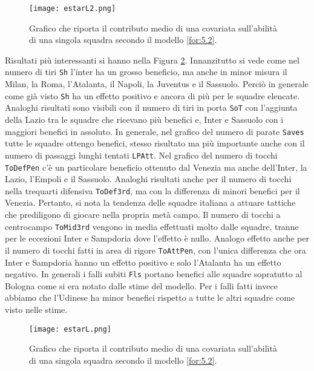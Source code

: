 \begin{figure}[htbp]
	\begin{center}
		\texttt{[image: estarL2.png]}
		\caption{Grafico che riporta il contributo medio di una covariata sull'abilità di una singola squadra secondo il modello \ref{for:5.2}.} \label{fig:effstar2}
	\end{center}
\end{figure}

Risultati più interessanti si hanno nella Figura \ref{fig:effstar3}. Innanzitutto si vede come nel numero di tiri \texttt{Sh} l'inter ha un grosso beneficio, ma anche in minor misura il Milan, la Roma, l'Atalanta, il Napoli, la Juventus e il Sassuolo. Perciò in generale come già visto \texttt{Sh} ha un effetto positivo e ancora di più per le squadre elencate. Analoghi risultati sono visibili con il numero di tiri in porta \texttt{SoT} con l'aggiunta della Lazio tra le squadre che ricevano più benefici e, Inter e Sassuolo con i maggiori benefici in assoluto. In generale, nel grafico del numero di parate \texttt{Saves} tutte le squadre ottengo benefici, stesso risultato ma più importante anche con il numero di passaggi lunghi tentati \texttt{LPAtt}. Nel grafico del numero di tocchi \texttt{ToDefPen} c'è un particolare beneficio ottenuto dal Venezia ma anche dell'Inter, la Lazio, l'Empoli e il Sassuolo. Analoghi risultati anche per il numero di tocchi nella trequarti difensiva \texttt{ToDef3rd}, ma con la differenza di minori benefici per il Venezia. Pertanto, si nota la tendenza delle squadre italiana a attuare tattiche che prediligono di giocare nella propria metà campo. Il numero di tocchi a centrocampo \texttt{ToMid3rd} vengono in media effettuati molto dalle squadre, tranne per le eccezioni Inter e Sampdoria dove l'effetto è nullo. Analogo effetto anche per il numero di tocchi fatti in area di rigore \texttt{ToAttPen}, con l'unica differenza che ora Inter e Sampdoria hanno un effetto positivo e solo l'Atalanta ha un effetto negativo. In generali i falli subiti \texttt{Fls} portano benefici alle squadre sopratutto al Bologna come si era notato dalle stime del modello. Per i falli fatti invece abbiamo che l'Udinese ha minor benefici rispetto a tutte le altri squadre come visto nelle stime.\\
\begin{figure}[htbp]
	\begin{center}
		\texttt{[image: estarL.png]}
		\caption{Grafico che riporta il contributo medio di una covariata sull'abilità di una singola squadra secondo il modello \ref{for:5.2}.} \label{fig:effstar3}
	\end{center}
\end{figure}

